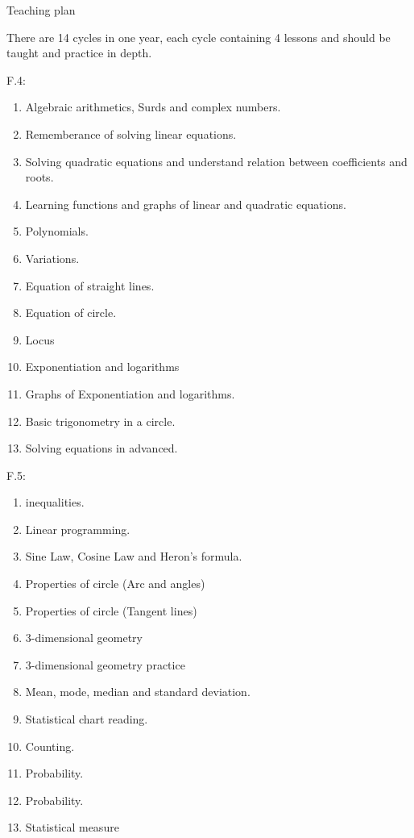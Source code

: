 \documentclass{article}
\begin{document}
    \begin{center}
        Teaching plan
    \end{center}

    There are 14 cycles in one year, each cycle containing 4 lessons and should be taught and practice in depth.

    \noindent F.4:\begin{enumerate}
        \item Algebraic arithmetics, Surds and complex numbers.
        \item Rememberance of solving linear equations.
        \item Solving quadratic equations and understand relation between coefficients and roots.
        \item Learning functions and graphs of linear and quadratic equations.
        \item Polynomials.
        \item Variations.
        \item Equation of straight lines.
        \item Equation of circle.
        \item Locus
        \item Exponentiation and logarithms
        \item Graphs of Exponentiation and logarithms.
        \item Basic trigonometry in a circle.
        \item Solving equations in advanced.
    \end{enumerate}

    \noindent F.5:\begin{enumerate}
        \item inequalities.
        \item Linear programming.
        \item Sine Law, Cosine Law and Heron's formula.
        \item Properties of circle (Arc and angles)
        \item Properties of circle (Tangent lines)
        \item 3-dimensional geometry
        \item 3-dimensional geometry practice
        \item Mean, mode, median and standard deviation.
        \item Statistical chart reading.
        \item Counting.
        \item Probability.
        \item Probability.
        \item Statistical measure
    \end{enumerate}
\end{document}
